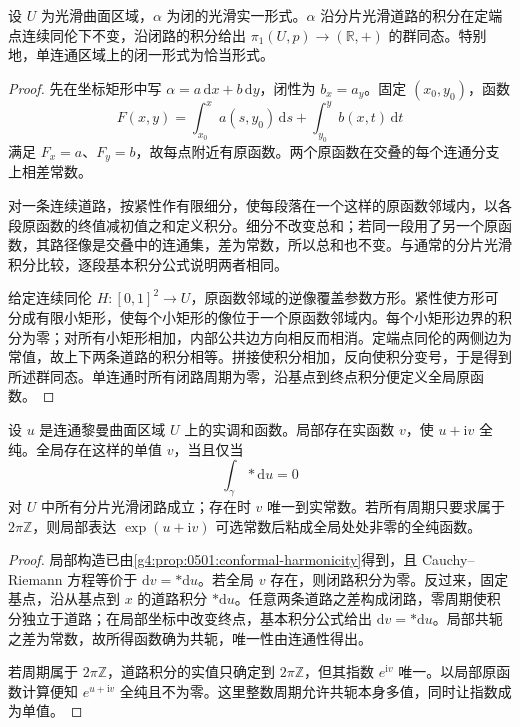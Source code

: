 \begin{lemma}
	\label{g4:lem:0501:closed-form-periods}
	设 \(U\) 为光滑曲面区域，\(\alpha\) 为闭的光滑实一形式。\(\alpha\) 沿分片光滑道路的积分在定端点连续同伦下不变，沿闭路的积分给出 \(\pi_1(U,p)\to(\mathbb R,+)\) 的群同态。特别地，单连通区域上的闭一形式为恰当形式。
\end{lemma}
\begin{proof}
	先在坐标矩形中写 \(\alpha=a\,\mathrm{d}x+b\,\mathrm{d}y\)，闭性为 \(b_x=a_y\)。固定 \((x_0,y_0)\)，函数
	\[
		F(x,y)=\int_{x_0}^x a(s,y_0)\,\mathrm{d}s
		+\int_{y_0}^y b(x,t)\,\mathrm{d}t
	\]
	满足 \(F_x=a\)、\(F_y=b\)，故每点附近有原函数。两个原函数在交叠的每个连通分支上相差常数。

	对一条连续道路，按紧性作有限细分，使每段落在一个这样的原函数邻域内，以各段原函数的终值减初值之和定义积分。细分不改变总和；若同一段用了另一个原函数，其路径像是交叠中的连通集，差为常数，所以总和也不变。与通常的分片光滑积分比较，逐段基本积分公式说明两者相同。

	给定连续同伦 \(H:[0,1]^2\to U\)，原函数邻域的逆像覆盖参数方形。紧性使方形可分成有限小矩形，使每个小矩形的像位于一个原函数邻域内。每个小矩形边界的积分为零；对所有小矩形相加，内部公共边方向相反而相消。定端点同伦的两侧边为常值，故上下两条道路的积分相等。拼接使积分相加，反向使积分变号，于是得到所述群同态。单连通时所有闭路周期为零，沿基点到终点积分便定义全局原函数。
\end{proof}

\begin{proposition}
	\label{g4:prop:0501:conjugate-periods}
	设 \(u\) 是连通黎曼曲面区域 \(U\) 上的实调和函数。局部存在实函数 \(v\)，使 \(u+\mathrm{i}v\) 全纯。全局存在这样的单值 \(v\)，当且仅当
	\[
		\int_\gamma*\mathrm{d}u=0
	\]
	对 \(U\) 中所有分片光滑闭路成立；存在时 \(v\) 唯一到实常数。若所有周期只要求属于 \(2\pi\mathbb Z\)，则局部表达 \(\exp(u+\mathrm{i}v)\) 可选常数后粘成全局处处非零的全纯函数。
\end{proposition}
\begin{proof}
	局部构造已由\cref{g4:prop:0501:conformal-harmonicity}得到，且 Cauchy--Riemann 方程等价于 \(\mathrm{d}v=*\mathrm{d}u\)。若全局 \(v\) 存在，则闭路积分为零。反过来，固定基点，沿从基点到 \(x\) 的道路积分 \(*\mathrm{d}u\)。任意两条道路之差构成闭路，零周期使积分独立于道路；在局部坐标中改变终点，基本积分公式给出 \(\mathrm{d}v=*\mathrm{d}u\)。局部共轭之差为常数，故所得函数确为共轭，唯一性由连通性得出。

	若周期属于 \(2\pi\mathbb Z\)，道路积分的实值只确定到 \(2\pi\mathbb Z\)，但其指数 \(e^{\mathrm{i}v}\) 唯一。以局部原函数计算便知 \(e^{u+\mathrm{i}v}\) 全纯且不为零。这里整数周期允许共轭本身多值，同时让指数成为单值。
\end{proof}

